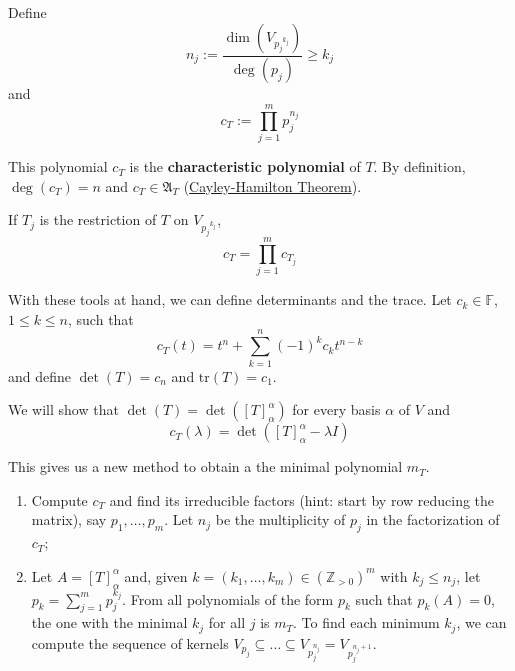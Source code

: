 Define 
\[
	n_j := \frac{\dim (V_{{p_j}^{k_j}})}{\deg(p_j)} \geq k_j
\]
and
\[
	c_T := \prod_{j=1}^m p_j^{n_j}
\]

This polynomial $c_T$ is the \textbf{characteristic polynomial} of $T$. By definition, $\deg(c_T) = n$ and $c_T \in \mathfrak{A}_T$ (\hyperref[thm:cayley-hamilton]{Cayley-Hamilton Theorem}).

If $T_j$ is the restriction of $T$ on $V_{{p_j}^{k_j}}$,
\[
	c_T = \prod_{j=1}^m c_{T_j}
\]

With these tools at hand, we can define determinants and the trace. Let $c_k \in \mathbb{F}$, $1 \leq k \leq n$, such that
\[
	c_T(t) = t^n + \sum_{k=1}^n (-1)^k c_k t^{n-k}
\]
and define $\det(T) = c_n$ and $\text{tr}(T) = c_1$.

We will show that $\det(T) = \det([T]_\alpha^\alpha)$ for every basis $\alpha$ of $V$ and
\[
	c_T(\lambda) = \det([T]_\alpha^\alpha - \lambda I)
\]

This gives us a new method to obtain a the minimal polynomial $m_T$.

\begin{enumerate}
	\item Compute $c_T$ and find its irreducible factors (hint: start by row reducing the matrix), say $p_1, \ldots, p_m$. Let $n_j$ be the multiplicity of $p_j$ in the factorization of $c_T$;
	\item Let $A = [T]_\alpha^\alpha$ and, given $k = (k_1, \ldots, k_m) \in (\mathbb{Z}_{>0})^m$ with $k_j \leq n_j$, let $p_k = \sum_{j=1}^m p_j^{k_j}$. From all polynomials of the form $p_k$ such that $p_k(A) = 0$, the one with the minimal $k_j$ for all $j$ is $m_T$. To find each minimum $k_j$, we can compute the sequence of kernels $V_{p_j} \subseteq \ldots \subseteq V_{p_j^{n_j}} = V_{p_j^{n_j + 1}}$.
\end{enumerate}

